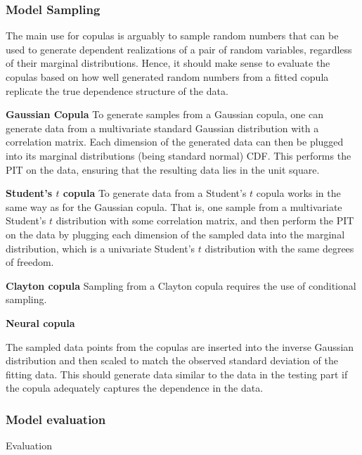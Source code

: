 \subsubsection{Model Sampling}
The main use for copulas is arguably to sample random numbers that can be used to generate dependent realizations of a pair of random variables, regardless of their marginal distributions. Hence, it should make sense to evaluate the copulas based on how well generated random numbers from a fitted copula replicate the true dependence structure of the data.  

\textbf{Gaussian Copula}
To generate samples from a Gaussian copula, one can generate data from a multivariate standard Gaussian distribution with a correlation matrix. Each dimension of the generated data can then be plugged into its marginal distributions (being standard normal) \gls{CDF}. This performs the \gls{PIT} on the data, ensuring that the resulting data lies in the unit square. 

\textbf{Student's $t$ copula} 
To generate data from a Student's $t$ copula works in the same way as for the Gaussian copula. That is, one sample from a multivariate Student's $t$ distribution with some correlation matrix, and then perform the \gls{PIT} on the data by plugging each dimension of the sampled data into the marginal distribution, which is a univariate Student's $t$ distribution with the same degrees of freedom. 

\textbf{Clayton copula}
Sampling from a Clayton copula requires the use of conditional sampling. 

\textbf{Neural copula}


The sampled data points from the copulas are inserted into the inverse Gaussian distribution and then scaled to match the observed standard deviation of the fitting data. This should generate data similar to the data in the testing part if the copula adequately captures the dependence in the data.

\subsubsection{Model evaluation}
Evaluation




